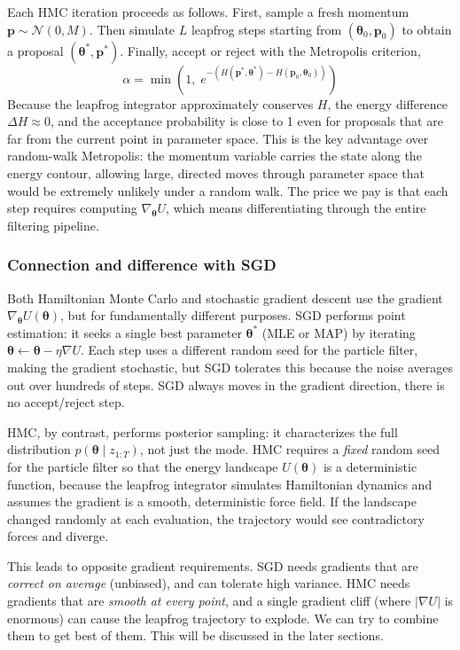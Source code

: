 \documentclass{article}
\renewcommand{\v}[1]{ \ensuremath{ {\mathbf{#1}} }}
\begin{document}
Each HMC iteration proceeds as follows. First, sample a fresh momentum $\v p \sim \mathcal{N}(0, M)$. Then simulate $L$ leapfrog steps starting from $(\v \theta_0, \v p_0)$ to obtain a proposal $(\v \theta^*, \v p^*)$. Finally, accept or reject with the Metropolis criterion,
\begin{equation}
    \alpha = \min\!\left(1,\; e^{-(H(\v p^*,\v \theta^*) - H(\v p_0,\v \theta_0))}\right)
\end{equation}
Because the leapfrog integrator approximately conserves $H$, the energy difference $\Delta H \approx 0$, and the acceptance probability is close to 1 even for proposals that are far from the current point in parameter space. This is the key advantage over random-walk Metropolis: the momentum variable carries the state along the energy contour, allowing large, directed moves through parameter space that would be extremely unlikely under a random walk. The price we pay is that each step requires computing $\nabla_{\v \theta} U$, which means differentiating through the entire filtering pipeline.

\subsubsection{Connection and difference with SGD}
Both Hamiltonian Monte Carlo and stochastic gradient descent use the gradient $\nabla_{\v \theta} U(\v \theta)$, but for fundamentally different purposes. SGD performs point estimation: it seeks a single best parameter $\v\theta^*$ (MLE or MAP) by iterating $\v \theta \leftarrow \v \theta - \eta \nabla U$. Each step uses a different random seed for the particle filter, making the gradient stochastic, but SGD tolerates this because the noise averages out over hundreds of steps. SGD always moves in the gradient direction, there is no accept/reject step.

HMC, by contrast, performs posterior sampling: it characterizes the full distribution $p(\v \theta \mid z_{1:T})$, not just the mode. HMC requires a \textit{fixed} random seed for the particle filter so that the energy landscape $U(\v \theta)$ is a deterministic function, because the leapfrog integrator simulates Hamiltonian dynamics and assumes the gradient is a smooth, deterministic force field. If the landscape changed randomly at each evaluation, the trajectory would see contradictory forces and diverge.

This leads to opposite gradient requirements. SGD needs gradients that are \textit{correct on average} (unbiased), and can tolerate high variance. HMC needs gradients that are \textit{smooth at every point}, and a single gradient cliff (where $|\nabla U|$ is enormous) can cause the leapfrog trajectory to explode. We can try to combine them to get best of them. This will be discussed in the later sections.
\end{document}
